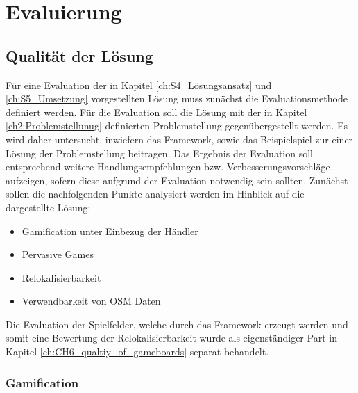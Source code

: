 \chapter{Evaluierung}
\label{ch:S6_Evaluierung}

\section{Qualität der Lösung}
\label{ch:CH6_qualtiy_of_solution}

Für eine Evaluation der in Kapitel \ref{ch:S4_Lösungsansatz} und \ref{ch:S5_Umsetzung} vorgestellten Lösung muss zunächst die Evaluationsmethode definiert werden. Für die Evaluation soll die Lösung mit der in Kapitel \ref{ch2:Problemstellunug} definierten Problemstellung gegenübergestellt werden. Es wird daher untersucht, inwiefern das Framework, sowie das Beispielspiel zur einer Lösung der Problemstellung beitragen. Das Ergebnis der Evaluation soll entsprechend weitere Handlungsempfehlungen bzw. Verbesserungsvorschläge aufzeigen, sofern diese aufgrund der Evaluation notwendig sein sollten. 
Zunächst sollen die nachfolgenden Punkte analysiert werden im Hinblick auf die dargestellte Lösung:

\begin{itemize}

\item Gamification unter Einbezug der Händler
\item Pervasive Games
\item Relokalisierbarkeit
\item Verwendbarkeit von OSM Daten

\end{itemize}

Die Evaluation der Spielfelder, welche durch das Framework erzeugt werden und somit eine Bewertung der Relokalisierbarkeit wurde als eigenständiger Part in Kapitel \ref{ch:CH6_qualtiy_of_gameboards} separat behandelt.


\subsection*{Gamification}

